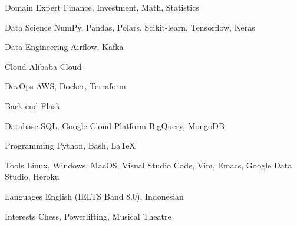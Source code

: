 

\begin{cvskills}

  \cvskill
    {Domain Expert} %
    {Finance, Investment, Math, Statistics} %

  \cvskill
    {Data Science} %
    {NumPy, Pandas, Polars, Scikit-learn, Tensorflow, Keras} %

  \cvskill
    {Data Engineering} %
    {Airflow, Kafka} %

  \cvskill
    {Cloud} %
    {Alibaba Cloud} %

  \cvskill
    {DevOps} %
    {AWS, Docker, Terraform} %

  \cvskill
    {Back-end} %
    {Flask} %

  \cvskill
    {Database} %
    {SQL, Google Cloud Platform BigQuery, MongoDB} %

  \cvskill
    {Programming} %
    {Python, Bash, LaTeX} %

  \cvskill
    {Tools} %
    {Linux, Windows, MacOS, Visual Studio Code, Vim, Emacs, Google Data Studio, Heroku} %

  \cvskill
    {Languages} %
    {English (IELTS Band 8.0), Indonesian} %

  \cvskill
    {Interests} %
    {Chess, Powerlifting, Musical Theatre} %

\end{cvskills}

